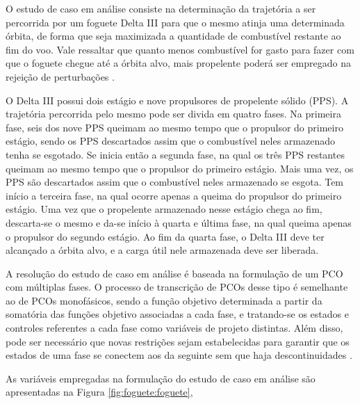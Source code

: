 

O estudo de caso em análise consiste na determinação da trajetória a ser percorrida por um foguete Delta III para que o mesmo atinja uma determinada órbita, de forma que seja maximizada a quantidade de combustível restante ao fim do voo. Vale ressaltar que quanto menos combustível for gasto para fazer com que o foguete chegue até a órbita alvo, mais propelente poderá ser empregado na rejeição de perturbações \cite{benson_gauss_2005}.

O Delta III possui dois estágio e nove propulsores de propelente sólido (PPS). A trajetória percorrida pelo mesmo pode ser divida em quatro fases. Na primeira fase, seis dos nove PPS queimam ao mesmo tempo que o propulsor do primeiro estágio, sendo os PPS descartados assim que o combustível neles armazenado tenha se esgotado. Se inicia então a segunda fase, na qual os três PPS restantes queimam ao mesmo tempo que o propulsor do primeiro estágio. Mais uma vez, os PPS são descartados assim que o combustível neles armazenado se esgota. Tem início a terceira fase, na qual ocorre apenas a queima do propulsor do primeiro estágio. Uma vez que o propelente armazenado nesse estágio chega ao fim, descarta-se o mesmo e da-se início à quarta e última fase, na qual queima apenas o propulsor do segundo estágio. Ao fim da quarta fase, o Delta III deve ter alcançado a órbita alvo, e a carga útil nele armazenada deve ser liberada. 

A resolução do estudo de caso em análise é baseada na formulação de um PCO com múltiplas fases. O processo de transcrição de PCOs desse tipo é semelhante ao de PCOs monofásicos, sendo a função objetivo determinada a partir da somatória das funções objetivo associadas a cada fase, e tratando-se os estados e controles referentes a cada fase como variáveis de projeto distintas. Além disso, pode ser necessário que novas restrições sejam estabelecidas para garantir que os estados de uma fase se conectem aos da seguinte sem que haja descontinuidades \cite{becerra_psopt_2019}. 

As variáveis empregadas na formulação do estudo de caso em análise são apresentadas na Figura \ref{fig:foguete:foguete},

